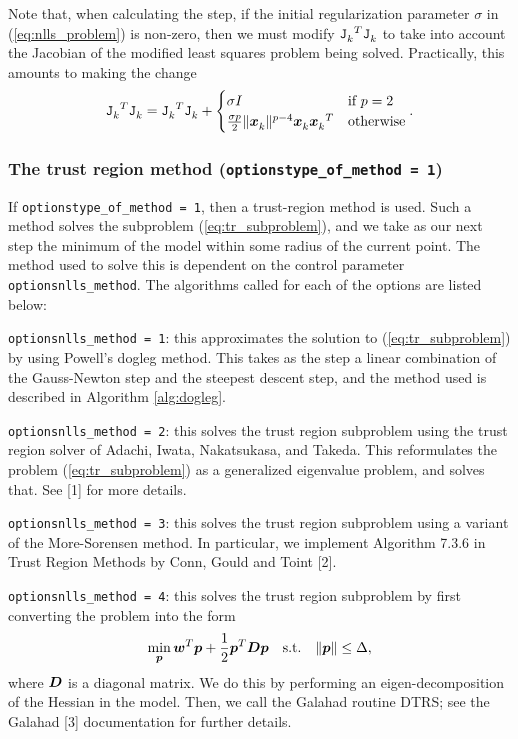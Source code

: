 Note that, when calculating the step, if the initial regularization parameter $\sigma$ in (\ref{eq:nlls_problem}) is
non-zero, then we must modify ${\iter[k]{\tJ}}^T\iter[k]{\tJ}$  to take into
account the Jacobian of the modified least squares problem being solved.  Practically, this amounts to making the change
\[
{\iter[k]{\tJ}}^T\iter[k]{\tJ} = {\iter[k]{\tJ}}^T\iter[k]{\tJ} +
 \begin{cases}
   \sigma I & \text{if }p = 2\\
   \frac{\sigma p}{2} \|\iter[k]{\vx}\|^{p-4}\iter[k]{\vx}{\iter[k]{\vx}}^T & \text{otherwise}
 \end{cases}.
\]

\subsubsection{The trust region method ({\tt options\ct type\_of\_method = 1})}
\label{sec:trust-region}

If {\tt options\ct type\_of\_method = 1}, then a trust-region method is used.  Such a method solves the subproblem (\ref{eq:tr_subproblem}), and we take as our next step
the minimum of the model within some radius of the current point.  The method used to solve
this is dependent on the control parameter {\tt options\ct nlls\_method}. The algorithms called for each of the options are listed below:
\begin{description}
\item {\tt options\ct nlls\_method = 1}: this approximates the solution to (\ref{eq:tr_subproblem}) by using Powell's dogleg method.  This takes as the step a linear combination of the Gauss-Newton step and the steepest descent step, and the method used is described in Algorithm \ref{alg:dogleg}.
\item {\tt options\ct nlls\_method = 2}: this solves the trust region subproblem using the trust region solver of  Adachi, Iwata, Nakatsukasa, and Takeda.  This reformulates the
problem (\ref{eq:tr_subproblem}) as a generalized eigenvalue problem, and solves that.  See
[1] for more details.
\item {\tt options\ct nlls\_method = 3}: this solves the trust region subproblem using
a variant of the More-Sorensen method.  In particular, we implement Algorithm 7.3.6
 in Trust Region Methods by Conn, Gould and Toint [2].
\item {\tt options\ct nlls\_method = 4}: this solves the trust region subproblem by first
converting the problem into the form
$$\min_\vp \vw^T \vp + \frac{1}{2} \vp^T \vD \vp \quad {\rm s.t.} \quad \|\vp\| \leq \Delta,$$
where $\vD$ is a diagonal matrix.  We do this by performing an eigen-decomposition of
the Hessian in the model.  Then, we call the {\sc Galahad} routine {\sc DTRS}; see
the {\sc Galahad} [3] documentation for further details.
\end{description}

